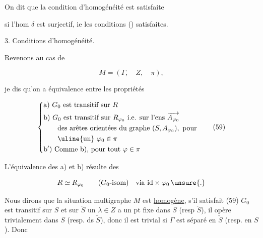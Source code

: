
On dit que la condition d'homogénéité est satisfaite

si l'hom $\delta$ est surjectif, ie les conditions () satisfaites.



3. Conditions d'homogénéité.

 Revenons au cas de  \deleted{\unsure{$\Gamma$}}


\[
M=(\Gamma,\quad Z,\quad\pi),
\]

je dis qu'on a équivalence entre les propriétés

\[
\left\{\begin{aligned}
&\text{a) }G_0\text{ est transitif sur }R\\
&\text{b) }G_0\text{ est transitif sur }R_{\varphi_0}\ \text{i.e. sur l'ens }\overrightarrow{A_{\varphi_0}}\\
&\qquad\text{des arêtes orientées du graphe }(S,A_{\varphi_0}),\ \text{pour}\\
&\qquad\text{\uline{un} }\varphi_0\in\pi\\
&\text{b$'$) Comme b), pour tout }\varphi\in\pi
\end{aligned}\right.
\tag*{(59)}
\]


L'équivalence des a) et b)  résulte des 

\[
R\simeq R_{\varphi_0}\qquad(G_0\text{-isom})\quad\text{via }\mathrm{id}\times\varphi_0\,\unsure{.}
\]

  Nous dirons que la situation  multigraphe $M$ est \uline{homogène}, s'il satisfait (59)    $G_0$ est transitif sur $S$ et sur $\check S$     un $\lambda\in Z$  a un pt fixe dans $S$ (resp $\check S$), il opère trivialement dans $S$ (resp. ds $\check S$), donc il est trivial si $\Gamma$ est séparé en $\check S$ (resp. en $S$). Donc

